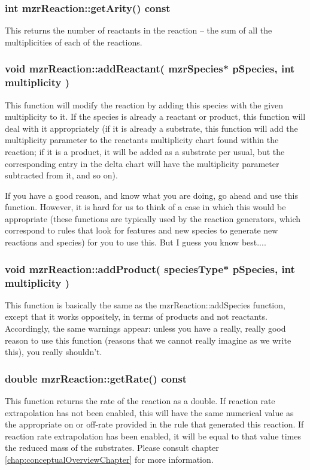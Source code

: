 \subsubsection{int mzrReaction::getArity() const}
This returns the number of reactants in the reaction -- the sum of all
the multiplicities of each of the reactions. 

\subsubsection{void mzrReaction::addReactant( mzrSpecies* pSpecies,
  int multiplicity )}

This function will modify the reaction by adding this species with the
given multiplicity to it.  If the species is already a reactant or
product, this function will deal with it appropriately (if it is
already a substrate, this function will add the multiplicity parameter
to the reactants multiplicity chart found within the reaction; if it
is a product, it will be added as a substrate per usual, but the
corresponding entry in the delta chart will have the multiplicity
parameter subtracted from it, and so on).  

If you have a good reason, and know what you are doing, go ahead and
use this function. However, it is hard for us to think of a case in
which this would be appropriate (these functions are typically used by
the reaction generators, which correspond to rules that look for
features and new species to generate new reactions and species) for
you to use this.  But I guess you know best....

\subsubsection{void mzrReaction::addProduct( speciesType* pSpecies,
  int multiplicity )}
This function is basically the same as the mzrReaction::addSpecies
function, except that it works oppositely, in terms of products and
not reactants.  Accordingly, the same warnings appear: unless you have
a really, really good reason to use this function (reasons that we
cannot really imagine as we write this), you really shouldn't.  

\subsubsection{double mzrReaction::getRate() const}
This function returns the rate of the reaction as a double.  If
reaction rate extrapolation has not been enabled, this will have the
same numerical value as the appropriate on or off-rate provided in the
rule that generated this reaction.  If reaction rate extrapolation has
been enabled, it will be equal to that value times the reduced mass of
the substrates.  Please consult chapter
\ref{chap:conceptualOverviewChapter} for more information.


